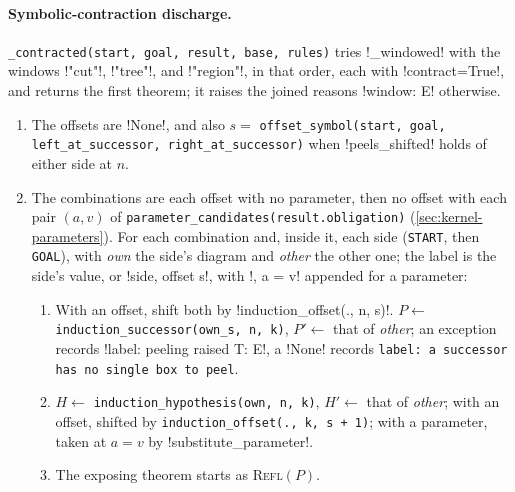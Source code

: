 \paragraph{Symbolic-contraction discharge.} \texttt{\_\allowbreak{}contracted(\allowbreak{}start,\allowbreak{} goal,\allowbreak{} result,\allowbreak{} base,\allowbreak{} rules)} tries \py!_windowed! with the windows \code!"cut"!, \code!"tree"!, and \code!"region"!, in that order, each with \code!contract=True!, and returns the first theorem; it raises the joined reasons \code!window: E! otherwise.

\begin{algorithm}\label{alg:kernel-windowed}
\begin{enumerate}
\item The offsets are \py!None!, and also $s=$ \texttt{offset\_\allowbreak{}symbol(\allowbreak{}start,\allowbreak{} goal,\allowbreak{} left\_\allowbreak{}at\_\allowbreak{}successor,\allowbreak{} right\_\allowbreak{}at\_\allowbreak{}successor)} when \py!peels_shifted! holds of either side at $n$.
\item The combinations are each offset with no parameter, then no offset with each pair $(a,v)$ of \texttt{parameter\_\allowbreak{}candidates(\allowbreak{}result.\allowbreak{}obligation)} (\cref{sec:kernel-parameters}). For each combination and, inside it, each side (\texttt{START}, then \texttt{GOAL}), with \textit{own} the side's diagram and \textit{other} the other one; the label is the side's value, or \code!side, offset s!, with \code!, a = v! appended for a parameter:
  \begin{enumerate}
  \item With an offset, shift both by \py!induction_offset(., n, s)!. $P\gets$ \texttt{induction\_\allowbreak{}successor(\allowbreak{}own\_\allowbreak{}s,\allowbreak{} n,\allowbreak{} k)}, $P'\gets$ that of \textit{other}; an exception records \code!label: peeling raised T: E!, a \py!None! records \texttt{label: a successor has no single box to peel}.
  \item $H\gets$ \texttt{induction\_\allowbreak{}hypothesis(\allowbreak{}own,\allowbreak{} n,\allowbreak{} k)}, $H'\gets$ that of \textit{other}; with an offset, shifted by \texttt{induction\_\allowbreak{}offset(\allowbreak{}.\allowbreak{},\allowbreak{} k,\allowbreak{} s + 1)}; with a parameter, taken at $a=v$ by \py!substitute_parameter!.
  \item The exposing theorem starts as \textsc{Refl}$(P)$.
    \begin{itemize}

\end{itemize}
\end{enumerate}
\end{enumerate}
\end{algorithm}
